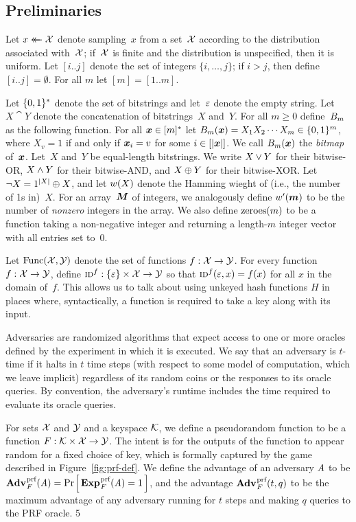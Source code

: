 \subsection{Preliminaries}
\label{sec:prelims}

Let $x \mathrel{\leftarrow\mkern-14mu\leftarrow} \mathcal{X}$ denote sampling~$x$ from a set~$\mathcal{X}$ according to the
distribution associated with~$\mathcal{X}$; if~$\mathcal{X}$ is finite and the distribution
is unspecified, then it is uniform.
%
Let $[i..j]$ denote the set of integers $\{i, \ldots, j\}$; if $i > j$, then
define $[i..j] = \emptyset$. For all $m$ let $[m] = [1..m]$.

Let $\{0,1\}^*$ denote the set of bitstrings and let~$\varepsilon$ denote the empty
string.
%
Let $X \cat Y$ denote the concatenation of bitstrings~$X$ and~$Y$.
%
For all $m\geq0$ define~${B}_m$ as the following function.  For all
$\v.x\in[m]^*$ let $\bmap_m(\v.x) = X_1X_2\cdots X_m\in\bits^m$, where
$X_v=1$ if and only if $\v.x_i = v$ for some $i\in[|\v.x|]$.
%
We call $\bmap_m(\v.x)$ the \emph{bitmap} of~$\v.x$.
%
Let~$X$ and~$Y$ be equal-length bitstrings. We write $X \vee Y$ for their
bitwise-OR, $X \wedge Y$ for their bitwise-AND, and $X \mathbin{\oplus} Y$ for their
bitwise-XOR. Let $\neg X = 1^{|X|} \mathbin{\oplus} X$, and let ${w}(X)$ denote the Hamming
wieght of (i.e., the number of 1s in)~$X$.
%
For an array~$\v.M$ of integers, we analogously define $\hw'(\v.m)$ to be the number
of \emph{nonzero} integers in the array. We also define $\mathrm{zeroes}(m)$ to be a
function taking a non-negative integer and returning a length-$m$ integer vector
with all entries set to~$0$.

Let $\mathrm{Func}(\mathcal{X},\mathcal{Y})$ denote the set of functions $f:\mathcal{X}\to\mathcal{Y}$.
%
For every function~$f: \mathcal{X} \to \mathcal{Y}$, define $\textnormal{\textsc{id}}^f: \{\varepsilon\} \times \mathcal{X} \to \mathcal{Y}$ so that
$\textnormal{\textsc{id}}^f(\varepsilon, x) = f(x)$ for all $x$ in the domain
of~$f$. This allows us to talk about using unkeyed hash functions $H$ in places where,
syntactically, a function is required to take a key along with its input.

Adversaries are randomized algorithms that expect access to one or more oracles
defined by the experiment in which it is executed. We say that an adversary is
$t$-time if it halts in $t$ time steps (with respect to some model of
computation, which we leave implicit) regardless of its random coins or the
responses to its oracle queries. By convention, the adversary's runtime includes
the time required to evaluate its oracle queries.

%
For sets $\mathcal{X}$ and $\mathcal{Y}$ and a keyspace $\mathcal{K}$, we define a pseudorandom
function to be a function $F: \mathcal{K} \times \mathcal{X} \to \mathcal{Y}$. The intent is for
the outputs of the function to appear random for a fixed choice of key, which is
formally captured by the game described in Figure~\ref{fig:prf-def}. We define
the advantage of an adversary $\mathit{A}$ to be
$\Adv{\prf}_F(\advA) = \Prob{\Exp{\prf}_F(\advA) = 1}$, and the advantage
$\Adv{\prf}_F(t,q)$ to be the maximum advantage of any adversary running for $t$
steps and making $q$ queries to the PRF oracle.
5

